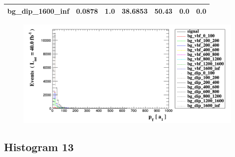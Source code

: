 \documentclass[a4paper, 10pt]{article}
\begin{document}
\begin{table}[H]
\begin{center}
\begin{tabular}{|m{23.0mm}|m{23.0mm}|m{18.0mm}|m{19.0mm}|m{19.0mm}|m{19.0mm}|m{19.0mm}|}
      \hline
      {\cellcolor{white}         bg\_dip\_1600\_inf}& {\cellcolor{white}         0.0878}& {\cellcolor{white}         1.0}& {\cellcolor{white}         38.6853}& {\cellcolor{white}         50.43}& {\cellcolor{green}         0.0}& {\cellcolor{green}         0.0}\\
\hline
    \end{tabular}
  \end{center}
\end{table}

\begin{figure}[H]
  \begin{center}
    \includegraphics[scale=0.45]{selection_11.png}\\
\caption{   }
  \end{center}
\end{figure}
      \newpage
\subsection{ Histogram 13}
\end{document}
